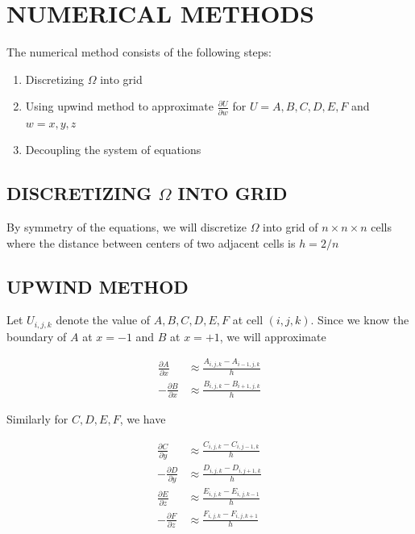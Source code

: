 \section{NUMERICAL METHODS}

The numerical method consists of the following steps:
\begin{enumerate}
	\item Discretizing $\Omega$ into grid
	\item Using upwind method to approximate $\frac{\partial U}{\partial w}$ for $U = A, B, C, D, E, F$ and $w = x, y, z$
	\item Decoupling the system of equations
\end{enumerate}

\subsection{DISCRETIZING $\Omega$ INTO GRID}

By symmetry of the equations, we will discretize $\Omega$ into grid of $n \times n \times n$ cells where the distance between centers of two adjacent cells is $h = 2 / n$

\subsection{UPWIND METHOD}

Let $U_{i, j, k}$ denote the value of $A, B, C, D, E, F$ at cell $(i, j, k)$. Since we know the boundary of $A$ at $x = -1$ and $B$ at $x = +1$, we will approximate


\begin{align*}
	\frac{\partial A}{\partial x} &\approx \frac{A_{i, j, k} - A_{i-1, j, k}}{h} \\
	- \frac{\partial B}{\partial x} &\approx \frac{B_{i, j, k} - B_{i+1, j, k}}{h}
\end{align*}

Similarly for $C, D, E, F$, we have

\begin{align*}
	\frac{\partial C}{\partial y} &\approx \frac{C_{i, j, k} - C_{i, j-1, k}}{h} \\
	- \frac{\partial D}{\partial y} &\approx \frac{D_{i, j, k} - D_{i, j+1, k}}{h} \\
	\frac{\partial E}{\partial z} &\approx \frac{E_{i, j, k} - E_{i, j, k-1}}{h} \\
- \frac{\partial F}{\partial z} &\approx \frac{F_{i, j, k} - F_{i, j, k+1}}{h}
\end{align*}


